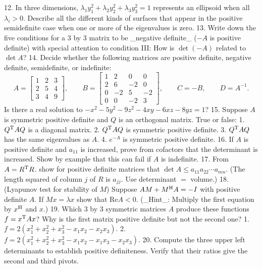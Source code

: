 12. In three dimensions, \(\lambda_{1}y_{1}^{2}+\lambda_{2}y_{2}^{2}+\lambda_{3}y_{3}^{2}=1\) represents an ellipsoid when all \(\lambda_{i}>0\). Describe all the different kinds of surfaces that appear in the positive semidefinite case when one or more of the eigenvalues is zero.
13. Write down the five conditions for a 3 by 3 matrix to be _negative definite_ (\(-A\) is positive definite) with special attention to condition III: How is \(\det(-A)\) related to \(\det A\)?
14. Decide whether the following matrices are positive definite, negative definite, semidefinite, or indefinite: \[A=\begin{bmatrix}1&2&3\\ 2&5&4\\ 3&4&9\end{bmatrix},\qquad B=\begin{bmatrix}1&2&0&0\\ 2&6&-2&0\\ 0&-2&5&-2\\ 0&0&-2&3\end{bmatrix},\qquad C=-B,\qquad D=A^{-1}.\] Is there a real solution to \(-x^{2}-5y^{2}-9z^{2}-4xy-6xz-8yz=1\)?
15. Suppose \(A\) is symmetric positive definite and \(Q\) is an orthogonal matrix. True or false: 1. \(Q^{\rm T}AQ\) is a diagonal matrix. 2. \(Q^{\rm T}AQ\) is symmetric positive definite. 3. \(Q^{\rm T}AQ\) has the same eigenvalues as \(A\). 4. \(e^{-A}\) is symmetric positive definite.
16. If \(A\) is positive definite and \(a_{11}\) is increased, prove from cofactors that the determinant is increased. Show by example that this can fail if \(A\) is indefinite.
17. From \(A=R^{\rm T}R\). show for positive definite matrices that \(\det A\leq a_{11}a_{22}\cdots a_{mn}\). (The length squared of column \(j\) of \(R\) is \(a_{jj}\). Use determinant \(=\) volume.)
18. (Lyapunov test for stability of \(M\)) Suppose \(AM+M^{\rm H}A=-I\) with positive definite \(A\). If \(Mx=\lambda x\) show that \(\mbox{Re}A<0\). (_Hint_: Multiply the first equation by \(x^{\rm H}\) and \(x\).)
19. Which 3 by 3 symmetric matrices \(A\) produce these functions \(f=x^{\rm T}Ax\)? Why is the first matrix positive definite but not the second one? 1. \(f=2(x_{1}^{2}+x_{2}^{2}+x_{3}^{2}-x_{1}x_{2}-x_{2}x_{3})\). 2. \(f=2(x_{1}^{2}+x_{2}^{2}+x_{3}^{2}-x_{1}x_{2}-x_{1}x_{3}-x_{2}x_{3})\).
20. Compute the three upper left determinants to establish positive definiteness. Verify that their ratios give the second and third pivots.

 